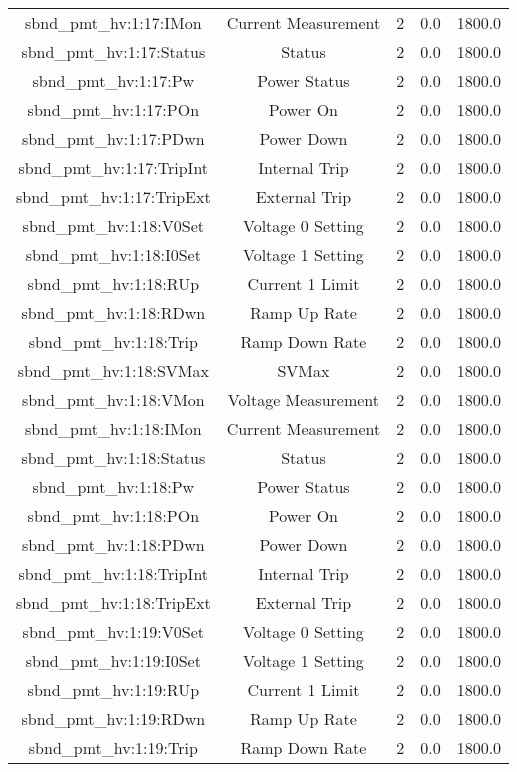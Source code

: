 \begin{center}
\begin{longtable}{c | c c c c }
sbnd\_pmt\_hv:1:17:IMon & Current Measurement & 2 & 0.0 & 1800.0\\ 
sbnd\_pmt\_hv:1:17:Status & Status & 2 & 0.0 & 1800.0\\ 
sbnd\_pmt\_hv:1:17:Pw & Power Status & 2 & 0.0 & 1800.0\\ 
sbnd\_pmt\_hv:1:17:POn & Power On & 2 & 0.0 & 1800.0\\ 
sbnd\_pmt\_hv:1:17:PDwn & Power Down & 2 & 0.0 & 1800.0\\ 
sbnd\_pmt\_hv:1:17:TripInt & Internal Trip & 2 & 0.0 & 1800.0\\ 
sbnd\_pmt\_hv:1:17:TripExt & External Trip & 2 & 0.0 & 1800.0\\ 
sbnd\_pmt\_hv:1:18:V0Set & Voltage 0 Setting & 2 & 0.0 & 1800.0\\ 
sbnd\_pmt\_hv:1:18:I0Set & Voltage 1 Setting & 2 & 0.0 & 1800.0\\ 
sbnd\_pmt\_hv:1:18:RUp & Current 1 Limit & 2 & 0.0 & 1800.0\\ 
sbnd\_pmt\_hv:1:18:RDwn & Ramp Up Rate & 2 & 0.0 & 1800.0\\ 
sbnd\_pmt\_hv:1:18:Trip & Ramp Down Rate & 2 & 0.0 & 1800.0\\ 
sbnd\_pmt\_hv:1:18:SVMax & SVMax & 2 & 0.0 & 1800.0\\ 
sbnd\_pmt\_hv:1:18:VMon & Voltage Measurement & 2 & 0.0 & 1800.0\\ 
sbnd\_pmt\_hv:1:18:IMon & Current Measurement & 2 & 0.0 & 1800.0\\ 
sbnd\_pmt\_hv:1:18:Status & Status & 2 & 0.0 & 1800.0\\ 
sbnd\_pmt\_hv:1:18:Pw & Power Status & 2 & 0.0 & 1800.0\\ 
sbnd\_pmt\_hv:1:18:POn & Power On & 2 & 0.0 & 1800.0\\ 
sbnd\_pmt\_hv:1:18:PDwn & Power Down & 2 & 0.0 & 1800.0\\ 
sbnd\_pmt\_hv:1:18:TripInt & Internal Trip & 2 & 0.0 & 1800.0\\ 
sbnd\_pmt\_hv:1:18:TripExt & External Trip & 2 & 0.0 & 1800.0\\ 
sbnd\_pmt\_hv:1:19:V0Set & Voltage 0 Setting & 2 & 0.0 & 1800.0\\ 
sbnd\_pmt\_hv:1:19:I0Set & Voltage 1 Setting & 2 & 0.0 & 1800.0\\ 
sbnd\_pmt\_hv:1:19:RUp & Current 1 Limit & 2 & 0.0 & 1800.0\\ 
sbnd\_pmt\_hv:1:19:RDwn & Ramp Up Rate & 2 & 0.0 & 1800.0\\ 
sbnd\_pmt\_hv:1:19:Trip & Ramp Down Rate & 2 & 0.0 & 1800.0\\ 

\end{longtable}
\end{center}

